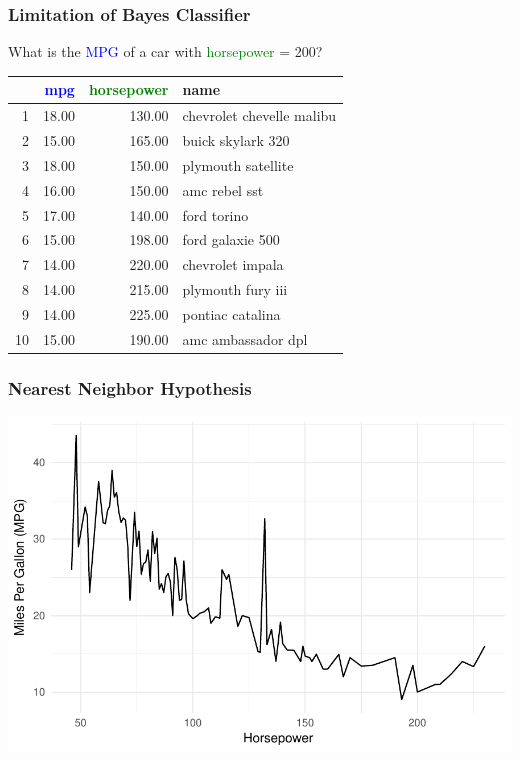 \documentclass{beamer}
\newcommand{\tc}[2]{\textcolor{#1}{#2}}
\newcommand{\tcb}[1]{\tc{blue}{#1}}
\newcommand{\tcg}[1]{\tc{green}{#1}}
\begin{document}
\begin{frame} \frametitle{Limitation of Bayes Classifier}
    \alert{What is the \tcb{MPG} of a car with \tcg{horsepower} = 200?} \\
    \begin{center}
            \begin{tabular}{rrrl}
                    \hline
                    & \tcb{mpg} & \tcg{horsepower} & name \\
                    \hline
                    1 & 18.00 & 130.00 & chevrolet chevelle malibu \\
                    2 & 15.00 & 165.00 & buick skylark 320 \\
                    3 & 18.00 & 150.00 & plymouth satellite \\
                    4 & 16.00 & 150.00 & amc rebel sst \\
                    5 & 17.00 & 140.00 & ford torino \\
                    6 & 15.00 & 198.00 & ford galaxie 500 \\
                    7 & 14.00 & 220.00 & chevrolet impala \\
                    8 & 14.00 & 215.00 & plymouth fury iii \\
                    9 & 14.00 & 225.00 & pontiac catalina \\
                    10 & 15.00 & 190.00 & amc ambassador dpl \\
                    \hline
            \end{tabular}
    \end{center}
\end{frame}

\begin{frame} \frametitle{Nearest Neighbor Hypothesis}
\begin{center}
\includegraphics[width=\linewidth]{../figs/class1/auto_data_mean.pdf}
\end{center}
\end{frame}
\end{document}

